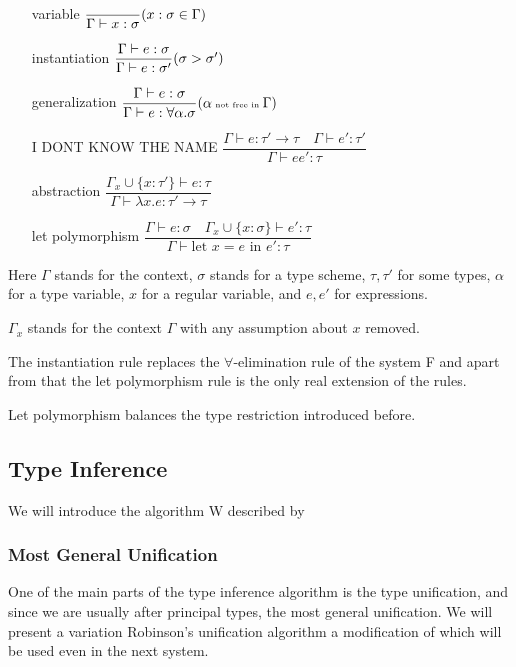 \begin{itemize}
    \item[variable] $\dfrac{}{\Gamma \vdash x : \sigma}\tiny{(x : \sigma \in \Gamma)}$
    \item[instantiation] $\dfrac{\Gamma \vdash e : \sigma}{\Gamma \vdash e : \sigma'}\tiny{(\sigma > \sigma')}$
    \item[generalization] $\dfrac{\Gamma \vdash e : \sigma}{\Gamma \vdash e : \forall \alpha . \sigma}\tiny{(\alpha \text{ not free in }\Gamma)}$
    \item[I DONT KNOW THE NAME] $\dfrac{\Gamma \vdash e : \tau' \rightarrow \tau \quad \Gamma \vdash e' : \tau' }{\Gamma \vdash e e' : \tau}$ %
    \item[abstraction] $\dfrac{\Gamma_x \cup \{x : \tau'\} \vdash e : \tau}{\Gamma \vdash \lambda x . e : \tau' \rightarrow \tau}$ %
    \item[let polymorphism] $\dfrac{\Gamma \vdash e : \sigma \quad \Gamma_x \cup \{x :\sigma\} \vdash e' : \tau}{\Gamma \vdash \text{let } x = e \text{ in } e' : \tau}$
\end{itemize}

Here $\Gamma$ stands for the context, $\sigma$ stands for a type scheme, $\tau, \tau'$ for some types, $\alpha$ for a type variable, $x$ for a regular variable, and $e, e'$ for expressions.

$\Gamma_x$ stands for the context $\Gamma$ with any assumption about $x$ removed.

The instantiation rule replaces the $\forall$-elimination rule of the system F and apart from that the let polymorphism rule is the only real extension of the rules.

Let polymorphism balances the type restriction introduced before.

\subsection{Type Inference}

We will introduce the algorithm W described by %

\subsubsection{Most General Unification}

One of the main parts of the type inference algorithm is the type unification, and since we are usually after principal types, the most general unification.
We will present a variation Robinson's unification algorithm a modification of which will be used even in the next system.

